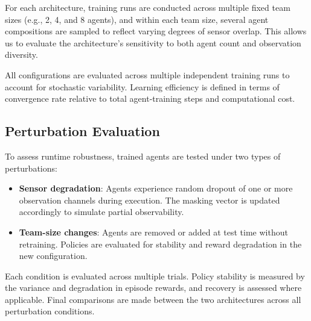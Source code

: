 For each architecture, training runs are conducted across multiple 
fixed team sizes (e.g., 2, 4, and 8 agents), and within each team size, 
several agent compositions are sampled to reflect varying degrees of sensor overlap. 
This allows us to evaluate the architecture's sensitivity to 
both agent count and observation diversity.

All configurations are evaluated across multiple independent 
training runs to account for stochastic variability.
Learning efficiency is defined in terms of convergence rate 
relative to total agent-training steps and computational cost.

\subsection{Perturbation Evaluation}

To assess runtime robustness, trained agents are tested under two types of perturbations:

\begin{itemize}
    \item \textbf{Sensor degradation}: Agents experience random dropout 
        of one or more observation channels during execution. 
        The masking vector is updated accordingly to simulate partial observability.
    \item \textbf{Team-size changes}: Agents are removed or added at test 
        time without retraining. Policies are evaluated for stability and 
        reward degradation in the new configuration.
\end{itemize}

Each condition is evaluated across multiple trials. 
Policy stability is measured by the variance and degradation in episode rewards, 
and recovery is assessed where applicable. 
Final comparisons are made between the two architectures across all perturbation conditions.
